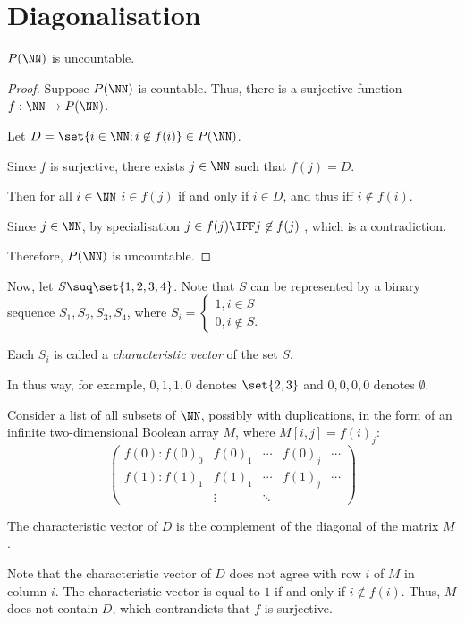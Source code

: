 \documentclass[11pt]{scrartcl}
\begin{document}
\section{Diagonalisation}
\begin{theorem}
$P(\NN)$ is uncountable.
\end{theorem}

\begin{proof}
  \hfill

  Suppose $P(\NN)$ is countable. Thus, there is a surjective function
  $f:\NN\to P(\NN)$.

  Let $D = \set{i\in\NN; i\not\in f(i)}\in P(\NN)$.

  Since $f$ is surjective, there exists $j\in\NN$ such that $f(j) = D$.

  Then for all $i\in\NN$ $i\in f(j)$ if and only if $i\in D$, and thus
  iff $i\not\in f(i)$.

  Since $j\in\NN$, by specialisation $j\in f(j) \IFF j \not \in f(j)$ , which is a contradiction.

  Therefore, $P(\NN)$ is uncountable.
\end{proof}


Now, let $S\suq \set{1, 2, 3, 4}$. Note that $S$ can be represented by a binary sequence $S_1,S_2, S_3, S_4$, where $S_i= \begin{cases}
1, i\in S\\
0, i\not\in S.
\end{cases}$

Each $S_i$ is called a \textit{characteristic vector} of the set $S$.

In thus way, for example, $0, 1, 1, 0$ denotes $\set{2, 3}$ and $0,0,0,0$ denotes $\emptyset$.

Consider a list of all subsets of $\NN$, possibly with duplications, in the form of an infinite two-dimensional Boolean array $M$, where $M[i, j] = f(i)_j$:
\[
  \begin{pmatrix}
    f(0): f(0)_0 & f(0)_1 & \cdots & f(0)_j & \cdots\\
    f(1): f(1)_1 & f(1)_1 & \cdots & f(1)_j & \cdots\\
     & \vdots & \ddots & &
  \end{pmatrix}
\]

The characteristic vector of $D$ is the complement of the diagonal of the matrix $M$.

Note that the characteristic vector of $D$ does not agree with row $i$
of $M$ in column $i$. The characteristic vector is equal to $1$ if and only if $i\not\in f(i)$. Thus, $M$ does not contain $D$, which contrandicts that $f$ is surjective.
\end{document}
